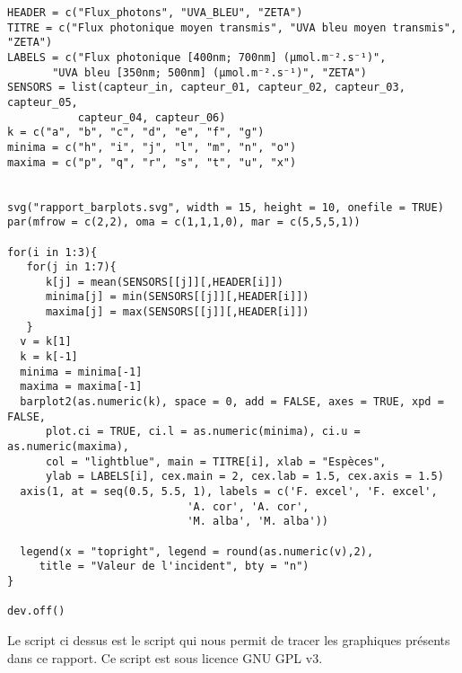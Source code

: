 ﻿\documentclass[12pt]{report}
\begin{document}
\begin{verbatim}
HEADER = c("Flux_photons", "UVA_BLEU", "ZETA")
TITRE = c("Flux photonique moyen transmis", "UVA bleu moyen transmis", "ZETA")
LABELS = c("Flux photonique [400nm; 700nm] (µmol.m⁻².s⁻¹)",
	   "UVA bleu [350nm; 500nm] (µmol.m⁻².s⁻¹)", "ZETA")
SENSORS = list(capteur_in, capteur_01, capteur_02, capteur_03, capteur_05,
	       capteur_04, capteur_06)
k = c("a", "b", "c", "d", "e", "f", "g")
minima = c("h", "i", "j", "l", "m", "n", "o")
maxima = c("p", "q", "r", "s", "t", "u", "x")


svg("rapport_barplots.svg", width = 15, height = 10, onefile = TRUE)
par(mfrow = c(2,2), oma = c(1,1,1,0), mar = c(5,5,5,1))

for(i in 1:3){
   for(j in 1:7){
      k[j] = mean(SENSORS[[j]][,HEADER[i]])
      minima[j] = min(SENSORS[[j]][,HEADER[i]])
      maxima[j] = max(SENSORS[[j]][,HEADER[i]])
   }
  v = k[1]
  k = k[-1]
  minima = minima[-1]
  maxima = maxima[-1]
  barplot2(as.numeric(k), space = 0, add = FALSE, axes = TRUE, xpd = FALSE,
	  plot.ci = TRUE, ci.l = as.numeric(minima), ci.u = as.numeric(maxima),
	  col = "lightblue", main = TITRE[i], xlab = "Espèces",
	  ylab = LABELS[i], cex.main = 2, cex.lab = 1.5, cex.axis = 1.5)
  axis(1, at = seq(0.5, 5.5, 1), labels = c('F. excel', 'F. excel',
						    'A. cor', 'A. cor',
						    'M. alba', 'M. alba'))

  legend(x = "topright", legend = round(as.numeric(v),2),
	 title = "Valeur de l'incident", bty = "n")
}

dev.off()
\end{verbatim}

Le script ci dessus est le script qui nous permit de tracer les graphiques 
présents dans ce rapport. Ce script est sous licence GNU GPL v3.
\end{document}
